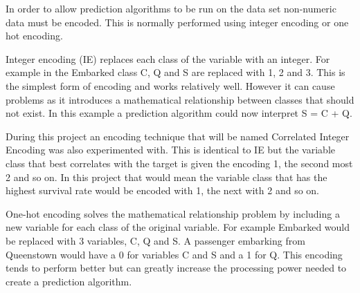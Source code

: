 \documentclass{article}
\begin{document}
In order to allow prediction algorithms to be run on the data set non-numeric data must be encoded. This is normally performed using integer encoding or one hot encoding.
\par 
Integer encoding (IE) replaces each class of the variable with an integer. For example in the Embarked class C, Q and S are replaced with 1, 2 and 3. This is the simplest form of encoding and works relatively well. However it can cause problems as it introduces a mathematical relationship between classes that should not exist. In this example a prediction algorithm could now interpret S = C + Q.
\par 
During this project an encoding technique that will be named Correlated Integer Encoding was also experimented with. This is identical to IE but the variable class that best correlates with the target is given the encoding 1, the second most 2 and so on. In this project that would mean the variable class that has the highest survival rate would be encoded with 1, the next with 2 and so on.
\par
One-hot encoding solves the mathematical relationship problem by including a new variable for each class of the original variable. For example Embarked would be replaced with 3 variables, C, Q and S. A passenger embarking from Queenstown would have a 0 for variables C and S and a 1 for Q. This encoding tends to perform better but can greatly increase the processing power needed to create a prediction algorithm.
\end{document}

